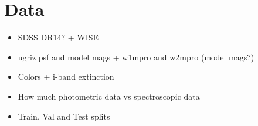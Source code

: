 \section{Data}
\label{sec:data}

\begin{itemize}
    \item SDSS DR14? + WISE
    \item ugriz psf and model mags + w1mpro and w2mpro (model mags?)
    \item Colors + i-band extinction
    \item How much photometric data vs spectroscopic data
    \item Train, Val and Test splits
\end{itemize}